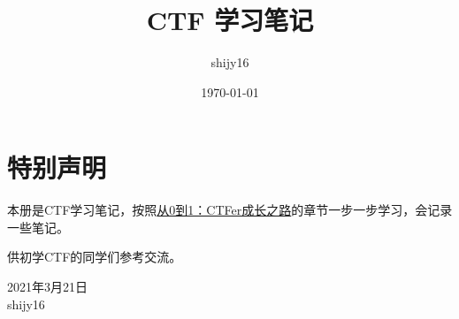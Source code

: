\documentclass[cn,11pt,chinese]{elegantbook}
\title{CTF 学习笔记}
\author{shijy16}
\date{\today}
\begin{document}
\maketitle

\chapter*{特别声明}
本册是CTF学习笔记，按照\href{https://book.nu1l.com/}{从0到1：CTFer成长之路}的章节一步一步学习，会记录一些笔记。

供初学CTF的同学们参考交流。

\vskip 1.5cm

\begin{flushright}
2021年3月21日\\
shijy16
\end{flushright}


\tableofcontents
\setcounter{page}{1}



\end{document}
